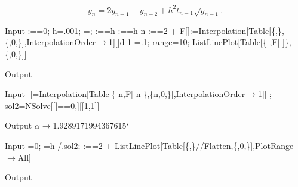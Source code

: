 \documentclass[a4paper]{article}
\begin{document}
\begin{sol}
$$
y_n = 2y_{n-1} - y_{n-2} + h^2 t_{n-1} \sqrt{y_{n-1}}.
$$
\begin{mmaCell}[addtoindex=-1,moredefined={h, F, range},morepattern={n_, n}]{Input}
  :==0;
  h=.001;
  =;
  :==h \mmaPat{\(\pmb{\alpha}\)}
  :==h n
  :==2-+
  F[\mmaPat{\(\pmb{\alpha}\)_}]:=Interpolation[Table[\{,\},\{,0,\}],InterpolationOrder\(\pmb{\to}\)1][]d-1
  \mmaDef{\(\pmb{\tau}\)}=.1;
  range=10;
  ListLinePlot[Table[\{\mmaDef{\(\pmb{\tau}\)} ,F[\mmaDef{\(\pmb{\tau}\)} ]\},\{,0,\}]]
\end{mmaCell}
 \begin{mmaCell}[moregraphics={moreig={scale=.5}}]{Output}
 \end{mmaCell}
\begin{mmaCell}[morefunctionlocal={n},moredefined={F, range}]{Input}
  \mmaUnd{\(\pmb{\Phi}\)}[\mmaUnd{\(\pmb{\alpha}\)}]=Interpolation[Table[\{\mmaDef{\(\pmb{\tau}\)} n,F[\mmaDef{\(\pmb{\tau}\)} n]\},\{n,0,\}],InterpolationOrder\(\pmb{\to}\)1][\mmaUnd{\(\pmb{\alpha}\)}];
  sol2=NSolve[\mmaUnd{\(\pmb{\Phi}\)}[\mmaFnc{\(\pmb{\alpha}\)}]==0,\mmaFnc{\(\pmb{\alpha}\)}][[1,1]]
\end{mmaCell}
\begin{mmaCell}[addtoindex=1]{Output}
  \(\alpha\to\)1.9289171994367615`
\end{mmaCell}
\begin{mmaCell}[moredefined={h},morepattern={n_, n}]{Input}
  =0;
  =h \mmaUnd{\(\pmb{\alpha}\)}/.sol2;
  :==2-+
  ListLinePlot[Table[\{,\}//Flatten,\{,0,\}],PlotRange\(\pmb{\to}\)All]
\end{mmaCell}
 \begin{mmaCell}[moregraphics={moreig={scale=.5}}]{Output}
 \end{mmaCell}
\end{sol}
\end{document}
